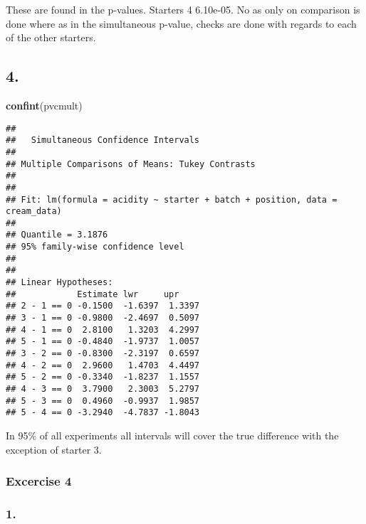 \documentclass[11pt,]{article}
\newenvironment{Shaded}{\begin{snugshade}}{\end{snugshade}}
\newcommand{\KeywordTok}[1]{\textcolor[rgb]{0.13,0.29,0.53}{\textbf{{#1}}}}
\newcommand{\DataTypeTok}[1]{\textcolor[rgb]{0.13,0.29,0.53}{{#1}}}
\newcommand{\CharTok}[1]{\textcolor[rgb]{0.31,0.60,0.02}{{#1}}}
\newcommand{\StringTok}[1]{\textcolor[rgb]{0.31,0.60,0.02}{{#1}}}
\newcommand{\OtherTok}[1]{\textcolor[rgb]{0.56,0.35,0.01}{{#1}}}
\newcommand{\NormalTok}[1]{{#1}}
\begin{document}
These are found in the p-values. Starters 4 6.10e-05. No as only on
comparison is done where as in the simultaneous p-value, checks are done
with regards to each of the other starters.

\subsection{4.}\label{section-15}

\begin{Shaded}
\begin{Highlighting}[]
\KeywordTok{confint}\NormalTok{(pvcmult)}
\end{Highlighting}
\end{Shaded}

\begin{verbatim}
## 
##   Simultaneous Confidence Intervals
## 
## Multiple Comparisons of Means: Tukey Contrasts
## 
## 
## Fit: lm(formula = acidity ~ starter + batch + position, data = cream_data)
## 
## Quantile = 3.1876
## 95% family-wise confidence level
##  
## 
## Linear Hypotheses:
##            Estimate lwr     upr    
## 2 - 1 == 0 -0.1500  -1.6397  1.3397
## 3 - 1 == 0 -0.9800  -2.4697  0.5097
## 4 - 1 == 0  2.8100   1.3203  4.2997
## 5 - 1 == 0 -0.4840  -1.9737  1.0057
## 3 - 2 == 0 -0.8300  -2.3197  0.6597
## 4 - 2 == 0  2.9600   1.4703  4.4497
## 5 - 2 == 0 -0.3340  -1.8237  1.1557
## 4 - 3 == 0  3.7900   2.3003  5.2797
## 5 - 3 == 0  0.4960  -0.9937  1.9857
## 5 - 4 == 0 -3.2940  -4.7837 -1.8043
\end{verbatim}

In 95\% of all experiments all intervals will cover the true difference
with the exception of starter 3.

\subsubsection{Excercise 4}\label{excercise-4}

\subsubsection{1.}\label{section-16}

\begin{Shaded}
\end{Shaded}
\end{document}

